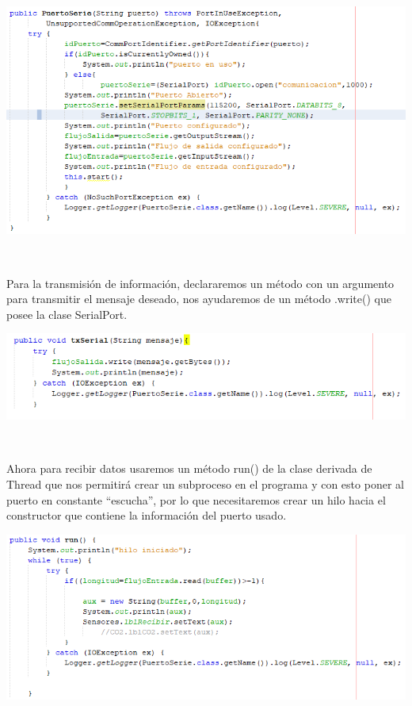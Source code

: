\documentclass[letterpaper, 10 pt, conference]{ieeeconf}
\begin{document}
\begin{center}
\includegraphics[scale=0.42]{Documento/Figuras/2.PNG}
\begin{scriptsize}
\\ 
\end{scriptsize}
\end{center}
Para la transmisión de información, declararemos un método con un argumento para transmitir el mensaje deseado, nos ayudaremos de un método .write() que posee la clase SerialPort.
\begin{center}
\includegraphics[scale=0.46]{Documento/Figuras/3.PNG}
\begin{scriptsize}
\\ 
\end{scriptsize}
\end{center}
Ahora para recibir datos usaremos un método run() de la clase derivada de Thread que nos permitirá crear un subproceso en el programa y con esto poner al puerto en constante “escucha”, por lo que necesitaremos crear un hilo hacia el constructor que contiene la información del puerto usado.
\begin{center}
\includegraphics[scale=0.45]{Documento/Figuras/4.PNG}
\begin{scriptsize}
\\ 
\end{scriptsize}
\end{center}
\end{document}
